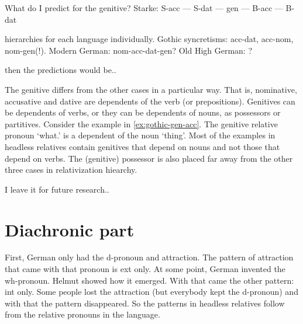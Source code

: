 What do I predict for the genitive? Starke: S-acc --- S-dat --- gen --- B-acc --- B-dat

hierarchies for each language individually. Gothic syncretisms: acc-dat, acc-nom, nom-gen(!). Modern German: nom-acc-dat-gen? Old High German: ?

then the predictions would be..

The genitive differs from the other cases in a particular way. That is, nominative, accusative and dative are dependents of the verb (or prepositions). Genitives can be dependents of verbs, or they can be dependents of nouns, as possessors or partitives. Consider the example in \ref{ex:gothic-gen-acc}. The genitive relative pronoun  `what.' is a dependent of the noun  `thing'. Most of the examples in headless relatives contain genitives that depend on nouns and not those that depend on verbs. The (genitive) possessor is also placed far away from the other three cases in  relativization hiearchy.

I leave it for future research..


\section{Diachronic part}

First, German only had the d-pronoun and attraction. The pattern of attraction that came with that pronoun is ext only.
At some point, German invented the wh-pronoun. Helmut showed how it emerged. With that came the other pattern: int only. Some people lost the attraction (but everybody kept the d-pronoun) and with that the pattern disappeared.
So the patterns in headless relatives follow from the relative pronouns in the language.
